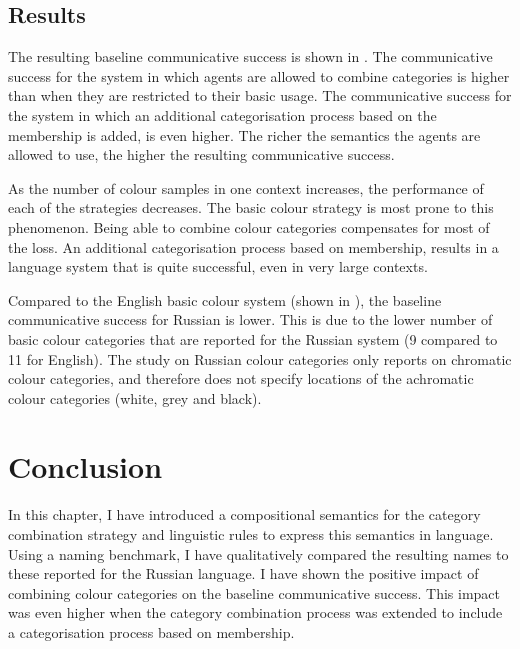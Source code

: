 \subsection{Results}

The resulting baseline communicative success is shown in . The communicative success for the system in
which agents are allowed to combine categories is higher than when
they are restricted to their basic usage. The communicative success
for the system in which an additional categorisation process based on
the membership is added, is even higher. The richer the semantics the
agents are allowed to use, the higher the resulting communicative
success.

As the number of colour samples in one context increases, the
performance of each of the strategies decreases. The basic
  colour strategy is most prone to this phenomenon. Being able to
combine colour categories compensates for most of the loss. An
additional categorisation process based on membership, results in a
language system that is quite successful, even in very large contexts.

Compared to the English basic colour system (shown in ), the baseline communicative success for Russian
is lower. This is due to the lower number of basic colour categories
that are reported for the Russian system (9 compared to 11 for
English). The study on Russian colour categories only reports on
chromatic colour categories, and therefore does not specify locations
of the achromatic colour categories (white, grey and black).


\section{Conclusion}

In this chapter, I have introduced a compositional semantics for the
category combination strategy and linguistic rules to express
this semantics in language. Using a naming benchmark, I have
qualitatively compared the resulting names to these reported for the
Russian language. I have shown the positive impact of combining
colour categories on the baseline communicative success. This impact
was even higher when the category combination process was extended
to include a categorisation process based on membership.

\newpage
\thispagestyle{empty}
